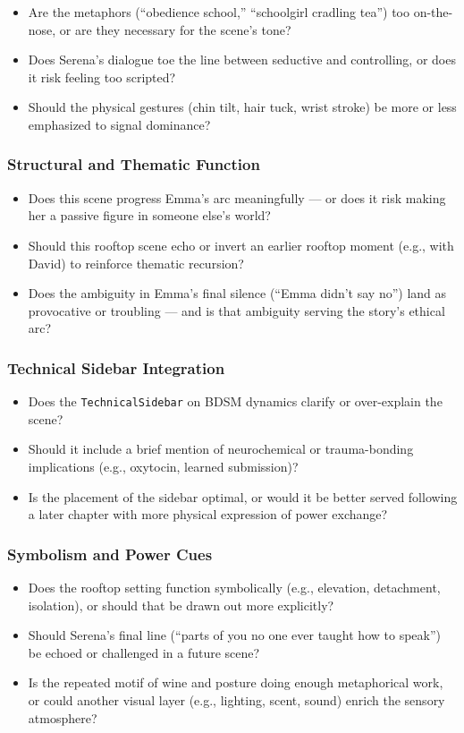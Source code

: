 \begin{itemize}
  \item Are the metaphors (“obedience school,” “schoolgirl cradling tea”) too on-the-nose, or are they necessary for the scene’s tone?
  \item Does Serena’s dialogue toe the line between seductive and controlling, or does it risk feeling too scripted?
  \item Should the physical gestures (chin tilt, hair tuck, wrist stroke) be more or less emphasized to signal dominance?
\end{itemize}

\subsubsection*{Structural and Thematic Function}

\begin{itemize}
  \item Does this scene progress Emma’s arc meaningfully — or does it risk making her a passive figure in someone else’s world?
  \item Should this rooftop scene echo or invert an earlier rooftop moment (e.g., with David) to reinforce thematic recursion?
  \item Does the ambiguity in Emma’s final silence (“Emma didn’t say no”) land as provocative or troubling — and is that ambiguity serving the story’s ethical arc?
\end{itemize}

\subsubsection*{Technical Sidebar Integration}

\begin{itemize}
  \item Does the \texttt{TechnicalSidebar} on BDSM dynamics clarify or over-explain the scene?
  \item Should it include a brief mention of neurochemical or trauma-bonding implications (e.g., oxytocin, learned submission)?
  \item Is the placement of the sidebar optimal, or would it be better served following a later chapter with more physical expression of power exchange?
\end{itemize}

\subsubsection*{Symbolism and Power Cues}

\begin{itemize}
  \item Does the rooftop setting function symbolically (e.g., elevation, detachment, isolation), or should that be drawn out more explicitly?
  \item Should Serena’s final line (“parts of you no one ever taught how to speak”) be echoed or challenged in a future scene?
  \item Is the repeated motif of wine and posture doing enough metaphorical work, or could another visual layer (e.g., lighting, scent, sound) enrich the sensory atmosphere?
\end{itemize}
